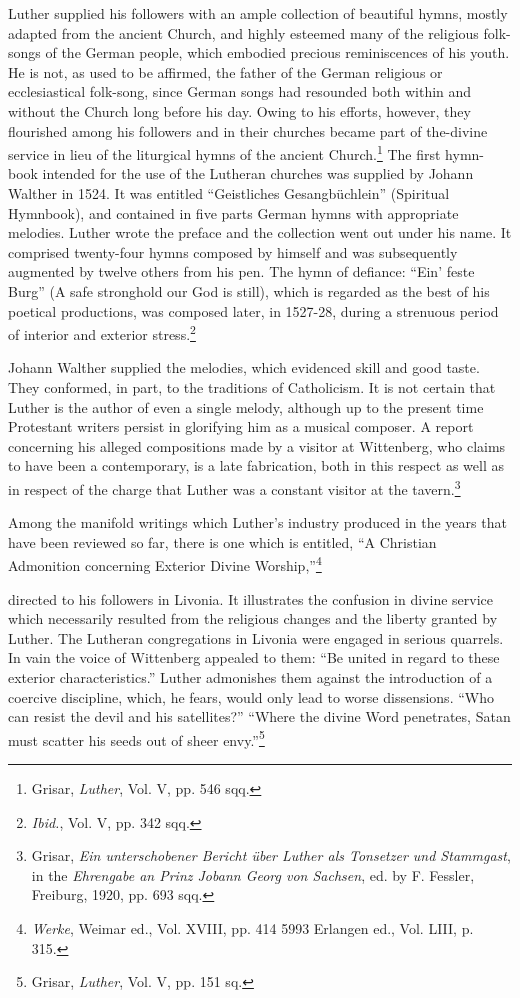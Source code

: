 Luther supplied his followers with an ample collection of beautiful hymns,
mostly adapted from the ancient Church, and highly
esteemed many of the religious folk-songs of the German people,
which embodied precious reminiscences of his youth. He is not, as
used to be affirmed, the father of the German religious or ecclesiastical
folk-song, since German songs had resounded both within
and without the Church long before his day. Owing to his efforts,
however, they flourished among his followers and in their churches
became part of the-divine service in lieu of the liturgical hymns
of the ancient Church.\footnote{Grisar, \textit{Luther}, Vol. V, pp. 546 sqq.}
The first hymn-book intended for the
use of the Lutheran churches was supplied by Johann Walther in
1524. It was entitled “Geistliches Gesangbüchlein” (Spiritual Hymnbook),
and contained in five parts German hymns with appropriate
melodies. Luther wrote the preface and the collection went out
under his name. It comprised twenty-four hymns composed by himself and
was subsequently augmented by twelve others from his pen.
The hymn of defiance: “Ein’ feste Burg” (A safe stronghold our God
is still), which is regarded as the best of his poetical productions,
was composed later, in 1527-28, during a strenuous period of interior
and exterior stress.\footnote{\textit{Ibid.}, Vol. V, pp. 342 sqq.}

Johann Walther supplied the melodies, which evidenced skill and
good taste. They conformed, in part, to the traditions of Catholicism.
It is not certain that Luther is the author of even a single melody,
although up to the present time Protestant writers persist in glorifying
him as a musical composer. A report concerning his alleged compositions
made by a visitor at Wittenberg, who claims to have been a
contemporary, is a late fabrication, both in this respect as well as in
respect of the charge that Luther was a constant visitor at the
tavern.\footnote
{Grisar, \textit{Ein unterschobener Bericht über Luther als Tonsetzer und Stammgast}, in the
\textit{Ehrengabe an Prinz Jobann Georg von Sachsen}, ed. by F. Fessler, Freiburg, 1920,
pp. 693 sqq.}


Among the manifold writings which Luther’s industry produced in
the years that have been reviewed so far, there is one which is entitled,
“A Christian Admonition concerning Exterior Divine Worship,”\footnote
{\textit{Werke}, Weimar ed., Vol. XVIII, pp. 414 5993 Erlangen ed., Vol. LIII, p. 315.}

directed to his followers in Livonia. It illustrates the confusion in
divine service which necessarily resulted from the religious
changes and the liberty granted by Luther. The Lutheran congregations
in Livonia were engaged in serious quarrels. In vain the voice
of Wittenberg appealed to them: “Be united in regard to these exterior
characteristics.” Luther admonishes them against the introduction of a
coercive discipline, which, he fears, would only lead to worse
dissensions. “Who can resist the devil and his satellites?” “Where the
divine Word penetrates, Satan must scatter his seeds out of sheer
envy.”\footnote{Grisar, \textit{Luther}, Vol. V, pp. 151 sq.}

